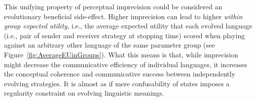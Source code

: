 This unifying property of perceptual imprecision could be considered
an evolutionary beneficial side-effect. Higher imprecision can lead to
higher \emph{within group expected utility}, i.e., the average
expected utility that each evolved language (i.e., pair of sender and
receiver strategy at stopping time) scored when playing against an
arbitrary other language of the same parameter group (see
Figure~\ref{fig:AverageEUinGroups}). What this means is that, while
imprecision might decrease the communicative efficiency of individual
languages, it increases the conceptual coherence and communicative
success between independently evolving strategies. It is almost as if
mere confusability of states imposes a regularity constraint on
evolving linguistic meanings.




